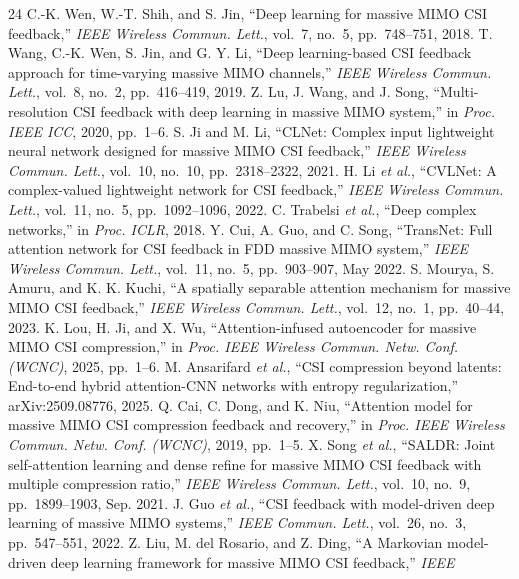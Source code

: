 \documentclass[journal]{IEEEtran}
\begin{document}
\begin{thebibliography}{24}
 C.-K. Wen, W.-T. Shih, and S. Jin, ``Deep learning for massive
MIMO CSI feedback,'' \emph{IEEE Wireless Commun. Lett.}, vol.~7, no.~5,
pp.~748--751, 2018.
 T. Wang, C.-K. Wen, S. Jin, and G. Y. Li, ``Deep learning-based
CSI feedback approach for time-varying massive MIMO channels,'' \emph{IEEE
Wireless Commun. Lett.}, vol.~8, no.~2, pp.~416--419, 2019.
 Z. Lu, J. Wang, and J. Song, ``Multi-resolution CSI feedback with
deep learning in massive MIMO system,'' in \emph{Proc. IEEE ICC}, 2020, pp.~1--6.
 S. Ji and M. Li, ``CLNet: Complex input lightweight neural network
designed for massive MIMO CSI feedback,'' \emph{IEEE Wireless Commun. Lett.},
vol.~10, no.~10, pp.~2318--2322, 2021.
 H. Li \emph{et al.}, ``CVLNet: A complex-valued lightweight
network for CSI feedback,'' \emph{IEEE Wireless Commun. Lett.}, vol.~11, no.~5,
pp.~1092--1096, 2022.
 C. Trabelsi \emph{et al.}, ``Deep complex networks,'' in
\emph{Proc. ICLR}, 2018.
 Y. Cui, A. Guo, and C. Song, ``TransNet: Full attention network
for CSI feedback in FDD massive MIMO system,'' \emph{IEEE Wireless Commun. Lett.},
vol.~11, no.~5, pp.~903--907, May 2022.
 S. Mourya, S. Amuru, and K. K. Kuchi, ``A spatially separable
attention mechanism for massive MIMO CSI feedback,'' \emph{IEEE Wireless Commun.
Lett.}, vol.~12, no.~1, pp.~40--44, 2023.
 K. Lou, H. Ji, and X. Wu, ``Attention-infused autoencoder for
massive MIMO CSI compression,'' in \emph{Proc. IEEE Wireless Commun. Netw. Conf.
(WCNC)}, 2025, pp.~1--6.
 M. Ansarifard \emph{et al.}, ``CSI compression beyond
latents: End-to-end hybrid attention-CNN networks with entropy regularization,''
arXiv:2509.08776, 2025.
 Q. Cai, C. Dong, and K. Niu, ``Attention model for massive MIMO
CSI compression feedback and recovery,'' in \emph{Proc. IEEE Wireless Commun. Netw.
Conf. (WCNC)}, 2019, pp.~1--5.
 X. Song \emph{et al.}, ``SALDR: Joint self-attention learning
and dense refine for massive MIMO CSI feedback with multiple compression ratio,''
\emph{IEEE Wireless Commun. Lett.}, vol.~10, no.~9, pp.~1899--1903, Sep. 2021.
 J. Guo \emph{et al.}, ``CSI feedback with model-driven deep
learning of massive MIMO systems,'' \emph{IEEE Commun. Lett.}, vol.~26, no.~3,
pp.~547--551, 2022.
 Z. Liu, M. del Rosario, and Z. Ding, ``A Markovian
model-driven deep learning framework for massive MIMO CSI feedback,'' \emph{IEEE
}
\end{thebibliography}
\end{document}
